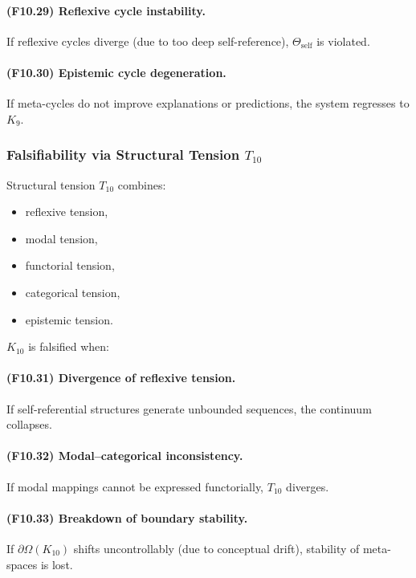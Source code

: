 \paragraph{(F10.29) Reflexive cycle instability.}
If reflexive cycles diverge (due to too deep self-reference),
$\Theta_{\mathrm{self}}$ is violated.

\paragraph{(F10.30) Epistemic cycle degeneration.}
If meta-cycles do not improve explanations or predictions,
the system regresses to $K_9$.



\subsubsection{Falsifiability via Structural Tension $T_{10}$}

Structural tension $T_{10}$ combines:

\begin{itemize}
    \item reflexive tension,
    \item modal tension,
    \item functorial tension,
    \item categorical tension,
    \item epistemic tension.
\end{itemize}

$K_{10}$ is falsified when:

\paragraph{(F10.31) Divergence of reflexive tension.}
If self-referential structures generate unbounded sequences,
the continuum collapses.

\paragraph{(F10.32) Modal–categorical inconsistency.}
If modal mappings cannot be expressed functorially,
$T_{10}$ diverges.

\paragraph{(F10.33) Breakdown of boundary stability.}
If $\partial\Omega(K_{10})$ shifts uncontrollably (due to conceptual drift),
stability of meta-spaces is lost.

